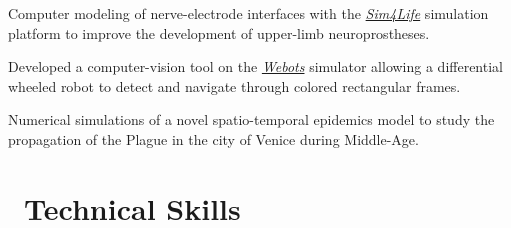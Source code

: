 \documentclass[a4paper]{cv}
\begin{document}
\begin{minipage}[t]{0.6\textwidth}
Computer modeling of nerve-electrode interfaces with the \href{http://www.zurichmedtech.com/sim4life/}{\emph{Sim4Life}} simulation platform to improve the development of upper-limb neuroprostheses.
\sectionspace

Developed a computer-vision tool on the \href{https://www.cyberbotics.com/overview}{\emph{Webots}} simulator allowing a differential wheeled robot to detect and navigate through colored rectangular frames.
\sectionspace

Numerical simulations of a novel spatio-temporal epidemics model to study the propagation of the Plague in the city of Venice during Middle-Age.
\sectionspace

\section{\texorpdfstring{\faWrench}\ \ Technical Skills}\sectionline



\end{minipage}
\end{document}
